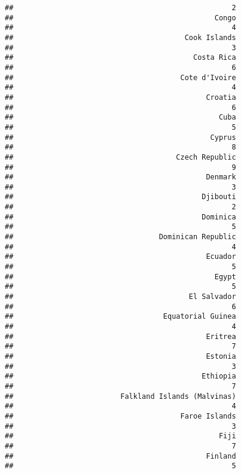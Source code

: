 \documentclass[
]{article}
\begin{document}
\begin{verbatim}
##                                                   2 
##                                               Congo 
##                                                   4 
##                                        Cook Islands 
##                                                   3 
##                                          Costa Rica 
##                                                   6 
##                                       Cote d'Ivoire 
##                                                   4 
##                                             Croatia 
##                                                   6 
##                                                Cuba 
##                                                   5 
##                                              Cyprus 
##                                                   8 
##                                      Czech Republic 
##                                                   9 
##                                             Denmark 
##                                                   3 
##                                            Djibouti 
##                                                   2 
##                                            Dominica 
##                                                   5 
##                                  Dominican Republic 
##                                                   4 
##                                             Ecuador 
##                                                   5 
##                                               Egypt 
##                                                   5 
##                                         El Salvador 
##                                                   6 
##                                   Equatorial Guinea 
##                                                   4 
##                                             Eritrea 
##                                                   7 
##                                             Estonia 
##                                                   3 
##                                            Ethiopia 
##                                                   7 
##                         Falkland Islands (Malvinas) 
##                                                   4 
##                                       Faroe Islands 
##                                                   3 
##                                                Fiji 
##                                                   7 
##                                             Finland 
##                                                   5 

\end{verbatim}
\end{document}

